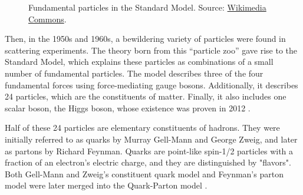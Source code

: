     \begin{figure}[b!]
        \centering{}
        \caption[The standard model.]{Fundamental particles in the Standard Model.
        Source: \hyperlink{https://commons.wikimedia.org/wiki/Main_Page}{Wikimedia Commons}.}
        \label{fig::parts_std_model}
    \end{figure}

    Then, in the 1950s and 1960s, a bewildering variety of particles were found in scattering experiments.
    The theory born from this ``particle zoo'' gave rise to the Standard Model, which explains these particles as combinations of a small number of fundamental particles.
    The model describes three of the four fundamental forces using force-mediating gauge bosons.
    Additionally, it describes 24 particles, which are the constituents of matter.
    Finally, it also includes one scalar boson, the Higgs boson, whose existence was proven in 2012 \cite{aad2012}.

    Half of these 24 particles are elementary constituents of hadrons.
    They were initially referred to as quarks by Murray Gell-Mann and George Zweig, and later as partons by Richard Feynman.
    Quarks are point-like spin-1/2 particles with a fraction of an electron's electric charge, and they are distinguished by "flavors".
    Both Gell-Mann and Zweig's constituent quark model and Feynman's parton model were later merged into the Quark-Parton model \cite{perkins2000}.

